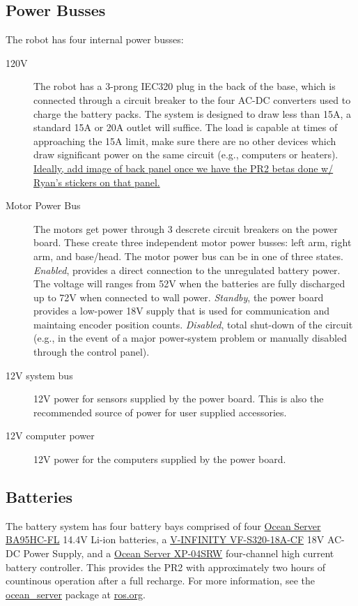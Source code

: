 \subsection{Power Busses}
The robot has four internal power busses:
\begin{description}
\item[120V] The robot has a 3-prong IEC320 plug in the back of the base, which is connected through a circuit breaker to the four AC-DC converters used to charge the 
battery packs.  The system is designed to draw less than 15A, a standard 15A or 20A outlet will suffice. The load is capable at times of approaching the 15A limit, 
make sure there are no other devices which draw significant power on the same circuit (e.g., computers or heaters).
\underline{Ideally, add image of back panel once we have the PR2 betas done w/ Ryan's stickers on that panel.}
\item[Motor Power Bus] The motors get power through 3 descrete circuit breakers on the power board. 
These create three independent motor power busses: left arm, right arm, and base/head.
The motor power bus can be in one of three states.  
\emph{Enabled}, provides a direct connection to the unregulated battery power. The voltage will ranges from 52V when the batteries are fully discharged up to 72V when connected to wall power.  
\emph{Standby}, the power board provides a low-power 18V supply that is used for communication and maintaing encoder position counts.  
\emph{Disabled}, total shut-down of the circuit (e.g., in the event of a major power-system problem or manually disabled through the control panel).
\item[12V system bus]
12V power for sensors supplied by the power board. This is also the recommended source of power for user supplied accessories.
\item[12V computer power]
12V power for the computers supplied by the power board.
\end{description}
\subsection{Batteries}
The battery system has four battery bays comprised of four \href{http://www.oceanserver-store.com/18.html}{Ocean Server BA95HC-FL}
14.4V Li-ion batteries, a \href{http://www.v-infinity.com/adtemplate_child.asp?c=710918&p=903285&catky=764537&subcatky1=46887&subcatky2=320934}{V-INFINITY VF-S320-18A-CF}
18V AC-DC Power Supply, and a \href{http://www.oceanserver-store.com/xpmibamamo.html}{Ocean Server XP-04SRW} four-channel high 
current battery controller. This provides the PR2 with approximately two hours of countinous operation after a full recharge. 
For more information, see the \href{http://www.ros.org/wiki/ocean\_server}{ocean\_server} package at \href{http://www.ros.org}{ros.org}.

